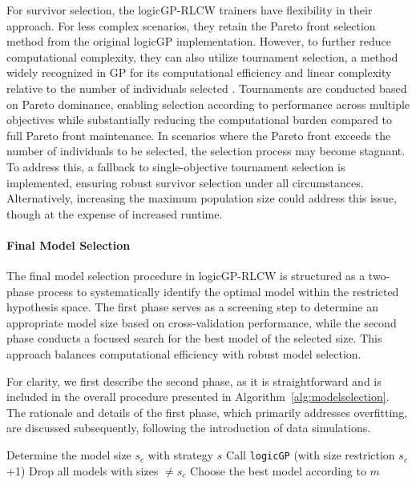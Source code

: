 \documentclass[a4paper,twoside]{article}
\begin{document}
For survivor selection, the logicGP-RLCW trainers have flexibility in their approach. For less complex scenarios, they retain the Pareto front selection method from the original logicGP implementation. However, to further reduce computational complexity, they can also utilize tournament selection, a method widely recognized in GP for its computational efficiency and linear complexity relative to the number of individuals selected \citep{GOLDBERG199169}. Tournaments are conducted based on Pareto dominance, enabling selection according to performance across multiple objectives while substantially reducing the computational burden compared to full Pareto front maintenance. In scenarios where the Pareto front exceeds the number of individuals to be selected, the selection process may become stagnant. To address this, a fallback to single-objective tournament selection is implemented, ensuring robust survivor selection under all circumstances. Alternatively, increasing the maximum population size could address this issue, though at the expense of increased runtime.

\paragraph{Final Model Selection}

The final model selection procedure in logicGP-RLCW is structured as a two-phase process to systematically identify the optimal model within the restricted hypothesis space. The first phase serves as a screening step to determine an appropriate model size based on cross-validation performance, while the second phase conducts a focused search for the best model of the selected size. This approach balances computational efficiency with robust model selection.

For clarity, we first describe the second phase, as it is straightforward and is included in the overall procedure presented in Algorithm~\ref{alg:modelselection}. The rationale and details of the first phase, which primarily addresses overfitting, are discussed subsequently, following the introduction of data simulations.



\begin{algorithm}
   
   
      
   
   
   Determine the model size $s_c$ with strategy $s$\;
Call \texttt{logicGP} (with size restriction $s_c$+1)\;
Drop all models with sizes $\neq s_c$\;
Choose the best model according to $m$\;
 

   \caption{Final Model Selection\label{alg:modelselection}}

\end{algorithm}
\end{document}

